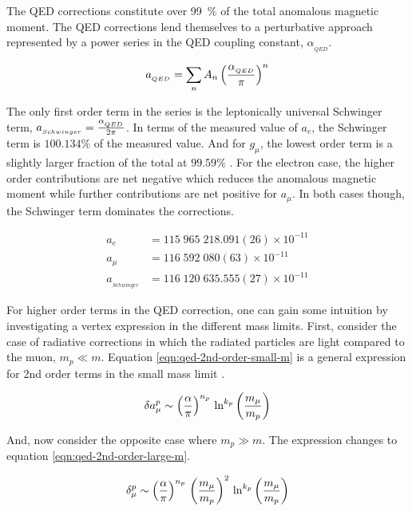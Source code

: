 The QED corrections constitute over \SI{99}{\percent} of the total anomalous magnetic moment.  The QED corrections lend themselves to a perturbative approach represented by a power series in the QED coupling constant, $\alpha_{_{QED}}$.

\begin{equation}
\label{eqn:qed-correction-series}
a_{_{QED}} = \sum_n{A_n \left(\frac{\alpha_{_{QED}}}{\pi} \right)^n}
\end{equation}

\noindent
The only first order term in the series is the leptonically universal Schwinger term, $a_{_{Schwinger}} = \frac{\alpha_{_{QED}}}{2\pi}$.  In terms of the measured value of $a_e$, the Schwinger term is $100.134\%$ of the measured value. And for $g_\mu$, the lowest order term is a slightly larger fraction of the total at $99.59\%$ \cite{codata}.  For the electron case, the higher order contributions are net negative which reduces the anomalous magnetic moment while further contributions are net positive for $a_\mu$. In both cases though, the Schwinger term dominates the corrections.

\begin{align*}
a_{e}   & = 115\;965\;218.091(26) \times 10^{-11} \\
a_{\mu} & = 116\;592\;080(63) \times 10^{-11} \\
a_{_{Schwinger}} & = 116\;120\;635.555(27) \times 10^{-11}
\end{align*}

For higher order terms in the QED correction, one can gain some intuition by investigating a vertex expression in the different mass limits.  First, consider the case of radiative corrections in which the radiated particles are light compared to the muon, $m_p \ll m$.  Equation \ref{eqn:qed-2nd-order-small-m} is a general expression for 2nd order terms in the small mass limit \cite{the-muon-g-2}.

\begin{equation}
\label{eqn:qed-2nd-order-small-m}
\delta a_\mu^p \sim \left(\frac{\alpha}{\pi} \right)^{n_p} \\
\ln^{k_p} \left( \frac{m_\mu}{m_p} \right)
\end{equation}

\noindent
And, now consider the opposite case where $m_p \gg m$.  The expression changes to equation \ref{eqn:qed-2nd-order-large-m}.

\begin{equation}
\label{eqn:qed-2nd-order-large-m}
\delta_\mu^p \sim \left( \frac{\alpha}{\pi} \right)^{n_p} \\
\left( \frac{m_\mu}{m_p} \right)^2 \\
\ln^{k_p} \left( \frac{m_\mu}{m_p} \right)
\end{equation}

